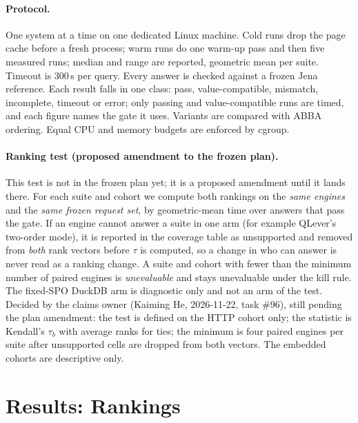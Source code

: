 \documentclass[11pt]{article}
\begin{document}
\paragraph{Protocol.} One system at a time on one dedicated Linux machine. Cold runs drop the page cache before a fresh
process; warm runs do one warm-up pass and then five measured runs; median and range are reported, geometric mean per suite.
Timeout is 300\,s per query. Every answer is checked against a frozen Jena reference. Each result falls in one class: pass,
value-compatible, mismatch, incomplete, timeout or error; only passing and value-compatible runs are timed, and each figure
names the gate it uses. Variants are compared with ABBA ordering. Equal CPU and memory budgets are enforced by cgroup.

\paragraph{Ranking test (proposed amendment to the frozen plan).} This test is not in the frozen plan yet; it is a proposed
amendment until it lands there. For each suite and cohort we compute both rankings on the \emph{same engines} and the \emph{same frozen
request set}, by geometric-mean time over answers that pass the gate. If an engine cannot answer a suite in one arm (for example
QLever's two-order mode), it is reported in the coverage table as unsupported and removed from \emph{both} rank vectors before
$\tau$ is computed, so a change in who can answer is never read as a ranking change. A suite and cohort with fewer than the minimum
number of paired engines is \emph{unevaluable} and stays unevaluable under the kill rule. The fixed-SPO DuckDB arm is diagnostic only
and not an arm of the test. Decided by the claims owner (Kaiming He, 2026-11-22, task \#96), still pending the plan amendment: the test is defined on the HTTP cohort only; the statistic is Kendall's $\tau_b$ with average ranks for ties; the minimum is four paired engines per suite after unsupported cells are dropped from both vectors. The embedded cohorts are descriptive only.

\section{Results: Rankings}
\end{document}
